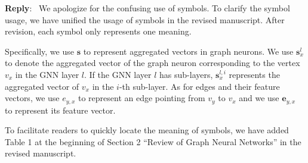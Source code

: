 \documentclass[12pt]{article}
\newcounter{reviewer}
\newcounter{point}[reviewer]
\newenvironment{reply}
   {\medskip \noindent \textbf{Reply}:\  }
   {\medskip}
\begin{document}
\begin{reply}
    We apologize for the confusing use of symbols.
    To clarify the symbol usage, we have unified the usage of symbols in the revised manuscript.
    After revision, each symbol only represents one meaning.
    
    Specifically, we use $\boldsymbol{s}$ to represent aggregated vectors in graph neurons.
    We use $\boldsymbol{s}^l_x$ to denote the aggregated vector of the graph neuron corresponding to the vertex $v_x$ in the GNN layer $l$.
    If the GNN layer $l$ has sub-layers, $\boldsymbol{s}^{l,i}_x$ represents the aggregated vector of $v_x$ in the $i$-th sub-layer.
    As for edges and their feature vectors, we use $e_{y,x}$ to represent an edge pointing from $v_y$ to $v_x$ and we use $\boldsymbol{e}_{y,x}$ to represent its feature vector.
    
    To facilitate readers to quickly locate the meaning of symbols, we have added Table 1 at the beginning of Section 2 ``Review of Graph Neural Networks'' in the revised manuscript.
    

\end{reply}
\end{document}
